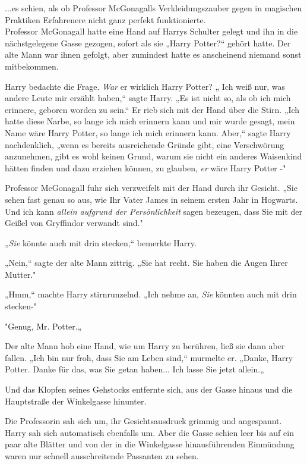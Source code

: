 {...es schien, als ob Professor McGonagalls Verkleidungszauber gegen in magischen Praktiken Erfahrenere nicht ganz perfekt funktionierte.\\ Professor McGonagall hatte eine Hand auf Harrys Schulter gelegt und ihn in die nächstgelegene Gasse gezogen, sofort als sie „Harry Potter?“ gehört hatte. Der alte Mann war ihnen gefolgt, aber zumindest hatte es anscheinend niemand sonst mitbekommen.

Harry bedachte die Frage. \emph{War} er wirklich Harry Potter? „ Ich weiß nur, was andere Leute mir erzählt haben,“ sagte Harry. „Es ist nicht so, als ob ich mich erinnere, geboren worden zu sein.“ Er rieb sich mit der Hand über die Stirn. „Ich hatte diese Narbe, so lange ich mich erinnern kann und mir wurde gesagt, mein Name wäre Harry Potter, so lange ich mich erinnern kann. Aber,“ sagte Harry nachdenklich, „wenn es bereits ausreichende Gründe gibt, eine Verschwörung anzunehmen, gibt es wohl keinen Grund, warum sie nicht ein anderes Waisenkind hätten finden und dazu erziehen können, zu glauben, \emph{er} wäre Harry Potter -"

Professor McGonagall fuhr sich verzweifelt mit der Hand durch ihr Gesicht. „Sie sehen fast genau so aus, wie Ihr Vater James in seinem ersten Jahr in Hogwarts. Und ich kann \emph{allein aufgrund der Persönlichkeit} sagen bezeugen, dass Sie mit der Geißel von Gryffindor verwandt sind."

„\emph{Sie} könnte auch mit drin stecken,“ bemerkte Harry.

„Nein,“ sagte der alte Mann zittrig. „Sie hat recht. Sie haben die Augen Ihrer Mutter."

„Hmm,“ machte Harry stirnrunzelnd. „Ich nehme an, \emph{Sie} könnten auch mit drin stecken-"

"Genug, Mr. Potter.„

Der alte Mann hob eine Hand, wie um Harry zu berühren, ließ sie dann aber fallen. „Ich bin nur froh, dass Sie am Leben sind,“ murmelte er. „Danke, Harry Potter. Danke für das, was Sie getan haben... Ich lasse Sie jetzt allein.„

Und das Klopfen seines Gehstocks entfernte sich, aus der Gasse hinaus und die Hauptstraße der Winkelgasse hinunter.

Die Professorin sah sich um, ihr Gesichtsausdruck grimmig und angespannt. Harry sah sich automatisch ebenfalls um. Aber die Gasse schien leer bis auf ein paar alte Blätter und von der in die Winkelgasse hinausführenden Einmündung waren nur schnell ausschreitende Passanten zu sehen.

}

